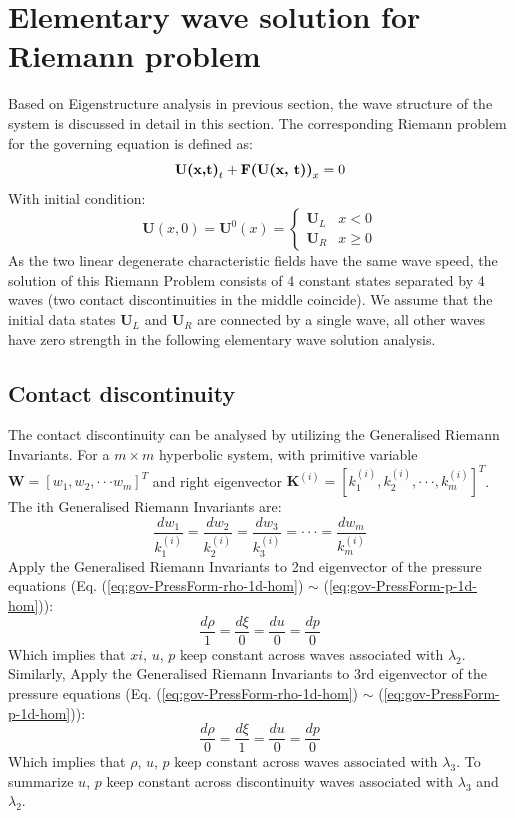\section{Elementary wave solution for Riemann problem}
Based on Eigenstructure analysis in previous section, the wave structure of the system is discussed in detail in this section. 
The corresponding Riemann problem for the governing equation is defined as: 
\begin{equation}
\textbf{U(x,t)}_t + \textbf{F(\textbf{U}(x, t))}_x = 0
\end{equation}
With initial condition: 
\begin{equation}
\textbf{U}(x, 0) = \textbf{U}^0(x) = \begin{cases} 
      \textbf{U}_L & x< 0\\
      \textbf{U}_R & x\geq 0
\end{cases}
\end{equation}
As the two linear degenerate characteristic fields have the same wave speed, the solution of this Riemann Problem consists of 4 constant states separated by 4 waves (two contact discontinuities in the middle coincide). 
We assume that the initial data states $\textbf{U}_L$ and $\textbf{U}_R$ are connected by a single wave, all other waves have zero strength in the following elementary wave solution analysis.

\subsection{Contact discontinuity}
The contact discontinuity can be analysed by utilizing the Generalised Riemann Invariants. For a $m \times m$ hyperbolic system, with primitive variable $\textbf{W} = \left[ w_1, w_2, \cdot \cdot \cdot w_m \right]^T$ and right eigenvector $\textbf{K}^{(i)}=[k^{(i)}_1,k^{(i)}_2, \cdot\cdot\cdot, k^{(i)}_m]^T$. The ith Generalised Riemann Invariants are: 
\begin{equation}
\frac{dw_1}{k^{(i)}_1}=\frac{dw_2}{k^{(i)}_2}=\frac{dw_3}{k^{(i)}_3}=\cdot\cdot\cdot=\frac{dw_m}{k^{(i)}_m}
\label{eq:Generalised-Riemann-Invariants}
\end{equation}
Apply the Generalised Riemann Invariants to 2nd eigenvector of the pressure equations (Eq. (\ref{eq:gov-PressForm-rho-1d-hom}) $\sim$ (\ref{eq:gov-PressForm-p-1d-hom})): 
\begin{equation}
\frac{d \rho}{1}=\frac{d \xi}{0} = \frac{d u}{0} = \frac{d p}{0}
\end{equation}
Which implies that $xi$, $u$, $p$ keep constant across waves associated with $\lambda_2$. 
Similarly, Apply the Generalised Riemann Invariants to 3rd eigenvector of the pressure equations (Eq. (\ref{eq:gov-PressForm-rho-1d-hom}) $\sim$ (\ref{eq:gov-PressForm-p-1d-hom})):
\begin{equation}
\frac{d \rho}{0}=\frac{d \xi}{1} = \frac{d u}{0} = \frac{d p}{0}
\end{equation}
Which implies that $\rho$, $u$, $p$ keep constant across waves associated with $\lambda_3$.
To summarize $u$, $p$ keep constant across discontinuity waves associated with $\lambda_3$ and $\lambda_2$.

